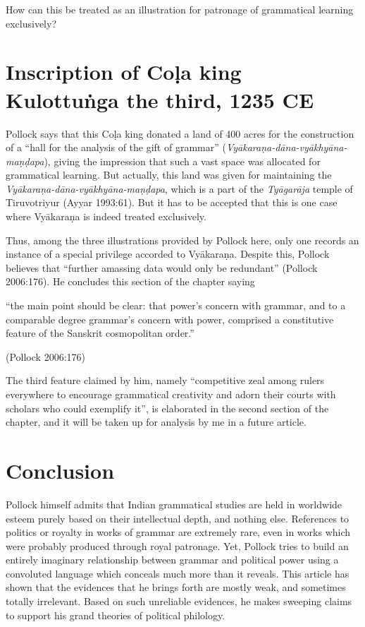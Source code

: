 How can this be treated as an illustration for patronage of grammatical learning exclusively?

\section{Inscription of Coḷa king Kulottuṅga the third, 1235 CE}\label{chap3-sec18}

Pollock says that this Coḷa king donated a land of 400 acres for the construction of a ``hall for the analysis of the gift of grammar'' ({\sl Vyākaraṇa-dāna-vyākhyāna-maṇḍapa}), giving the impression that such a vast space was allocated for grammatical learning. But actually, this land was given for maintaining the {\sl Vyākaraṇa-dāna-vyākhyāna-maṇḍapa}, which is a part of the {\sl Tyāgarāja} temple of Tiruvotriyur (Ayyar 1993:61). But it has to be accepted that this is one case where Vyākaraṇa is indeed treated exclusively.

Thus, among the three illustrations provided by Pollock here, only one records an instance of a special privilege accorded to Vyākaraṇa. Despite this, Pollock believes that ``further amassing data would only be redundant'' (Pollock 2006:176). He concludes this section of the chapter saying
\begin{myquote}
``the main point should be clear: that power’s concern with grammar, and to a comparable degree grammar's concern with power, comprised a constitutive feature of the Sanskrit cosmopolitan order.''

\hfill (Pollock 2006:176)
\end{myquote}
The third feature claimed by him, namely ``competitive zeal among rulers everywhere to encourage grammatical creativity and adorn their courts with scholars who could exemplify it'', is elaborated in the second section of the chapter, and it will be taken up for analysis by me in a future article.

\section*{Conclusion}

Pollock himself admits that Indian grammatical studies are held in worldwide esteem purely based on their intellectual depth, and nothing else. References to politics or royalty in works of grammar are extremely rare, even in works which were probably produced through royal patronage. Yet, Pollock tries to build an entirely imaginary relationship between grammar and political power using a convoluted language which conceals much more than it reveals. This article has shown that the evidences that he brings forth are mostly weak, and sometimes totally irrelevant. Based on such unreliable evidences, he makes sweeping claims to support his grand theories of political philology. 

